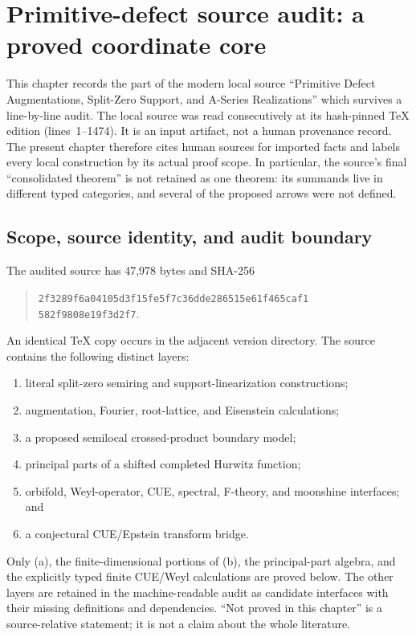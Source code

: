 \section{Primitive-defect source audit: a proved coordinate core}
\label{sec:primitive-defect-source-audit}

This chapter records the part of the modern local source
``Primitive Defect Augmentations, Split-Zero Support, and A-Series Realizations''
which survives a line-by-line audit.  The local source was read consecutively
at its hash-pinned TeX edition (lines~1--1474).  It is an input artifact, not a
human provenance record.  The present chapter therefore cites human sources
for imported facts and labels every local construction by its actual proof
scope.  In particular, the source's final ``consolidated theorem'' is not
retained as one theorem: its summands live in different typed categories, and
several of the proposed arrows were not defined.

\subsection{Scope, source identity, and audit boundary}

The audited source has 47,978 bytes and SHA-256
\begin{quote}\small\texttt{2f3289f6a04105d3f15fe5f7c36dde286515e61f465caf1}\allowbreak\\
\texttt{582f9808e19f3d2f7}.\end{quote}
An identical TeX copy occurs in the adjacent version directory.  The source
contains the following distinct layers:

\begin{enumerate}[label=(\alph*)]
  \item literal split-zero semiring and support-linearization constructions;
  \item augmentation, Fourier, root-lattice, and Eisenstein calculations;
  \item a proposed semilocal crossed-product boundary model;
  \item principal parts of a shifted completed Hurwitz function;
  \item orbifold, Weyl-operator, CUE, spectral, F-theory, and moonshine
        interfaces; and
  \item a conjectural CUE/Epstein transform bridge.
\end{enumerate}

Only (a), the finite-dimensional portions of (b), the principal-part algebra,
and the explicitly typed finite CUE/Weyl calculations are proved below.  The
other layers are retained in the machine-readable audit as candidate
interfaces with their missing definitions and dependencies.  ``Not proved in
this chapter'' is a source-relative statement; it is not a claim about the
whole literature.

